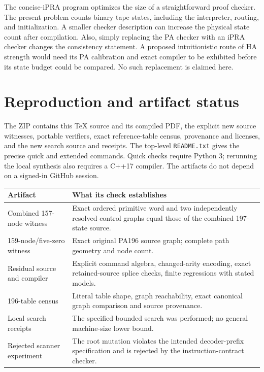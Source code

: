 \documentclass[11pt,letterpaper]{article}
\newcommand{\file}[1]{\texttt{\nolinkurl{#1}}}
\begin{document}
The concise-iPRA program optimizes the size of a straightforward proof
checker. The present problem counts binary tape states, including the
interpreter, routing, and initialization. A smaller checker description
can increase the physical state count after compilation. Also, simply
replacing the PA checker with an iPRA checker changes the consistency
statement. A proposed intuitionistic route of HA strength would need its
PA calibration and exact compiler to be exhibited before its state budget
could be compared. No such replacement is claimed here.

\section{Reproduction and artifact status}

The ZIP contains this TeX source and its compiled PDF, the explicit new
source witnesses, portable verifiers, exact reference-table census,
provenance and licenses, and the new search source and receipts. The
top-level \file{README.txt} gives the precise quick and extended commands.
Quick checks require Python 3; rerunning the local synthesis also requires
a C++17 compiler. The artifacts do not depend on a signed-in GitHub session.

\begin{table}[ht]
\centering\small
\begin{tabular}{@{}p{4.7cm}p{8.9cm}@{}}
\toprule
Artifact & What its check establishes \\
\midrule
Combined 157-node witness & Exact ordered primitive word and two independently resolved control graphs equal those of the combined 197-state source.\\
159-node/five-zero witness & Exact original PA196 source graph; complete path geometry and node count.\\
Residual source and compiler & Explicit command algebra, changed-arity encoding, exact retained-source splice checks, finite regressions with stated models.\\
196-table census & Literal table shape, graph reachability, exact canonical graph comparison and source provenance.\\
Local search receipts & The specified bounded search was performed; no general machine-size lower bound.\\
Rejected scanner experiment & The root mutation violates the intended decoder-prefix specification and is rejected by the instruction-contract checker.\\
\bottomrule
\end{tabular}
\end{table}
\end{document}
